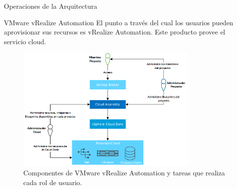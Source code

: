 \begin{subsection}{Operaciones de la Arquitectura}
\begin{subsubsection}{VMware vRealize Automation}
        El punto a través del cual los usuarios pueden aprovisionar sus recursos es vRealize Automation. Este producto provee el servicio cloud. 
        \begin{figure}[h]
            \centering
            \includegraphics[width=0.8\textwidth]{imaxes/vRealize_pruebaconcepto/ComponentesVRA.png}
            \caption{Componentes de VMware vRealize Automation y tareas que realiza cada rol de usuario.}
            \label{fig:vra-components}
        \end{figure}
        \FloatBarrier

\end{subsubsection}
\end{subsection}
